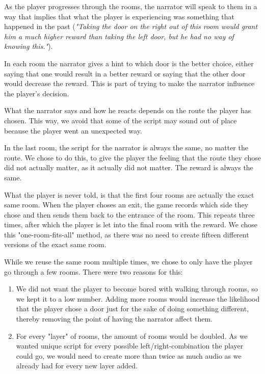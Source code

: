 As the player progresses through the rooms, the narrator will speak to them in a way that implies that what the player is experiencing was something that happened in the past (\textit{"Taking the door on the right out of this room would grant him a much higher reward than taking the left door, but he had no way of knowing this."}).

In each room the narrator gives a hint to which door is the better choice, either saying that one would result in a better reward or saying that the other door would decrease the reward. This is part of trying to make the narrator influence the player's decision.

What the narrator says and how he reacts depends on the route the player has chosen. This way, we avoid that some of the script may sound out of place because the player went an unexpected way.

In the last room, the script for the narrator is always the same, no matter the route. We chose to do this, to give the player the feeling that the route they chose did not actually matter, as it actually did not matter. The reward is always the same.

What the player is never told, is that the first four rooms are actually the exact same room. When the player choses an exit, the game records which side they chose and then sends them back to the entrance of the room. This repeats three times, after which the player is let into the final room with the reward. We chose this "one-room-fits-all" method, as there was no need to create fifteen different versions of the exact same room.

While we reuse the same room multiple times, we chose to only have the player go through a few rooms. There were two reasons for this:
\begin{enumerate}
	\item We did not want the player to become bored with walking through rooms, so we kept it to a low number. Adding more rooms would increase the likelihood that the player chose a door just for the sake of doing something different, thereby removing the point of having the narrator affect them.
	\item For every "layer" of rooms, the amount of rooms would be doubled. As we wanted unique script for every possible left/right-combination the player could go, we would need to create more than twice as much audio as we already had for every new layer added.
\end{enumerate}